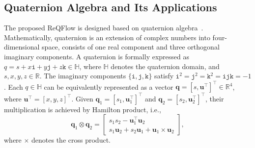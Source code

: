 \subsection{Quaternion Algebra and Its Applications}
The proposed ReQFlow is designed based on quaternion algebra~\cite{dam1998quaternions,zhu2018quaternion}.
Mathematically, quaternion is an extension of complex numbers into four-dimensional space, consists of one real component and three orthogonal imaginary components. 
A quaternion is formally expressed as $q = s + x\texttt{i} + y\texttt{j} + z\texttt{k} \in \mathbb{H}$, where $\mathbb{H}$ denotes the quaternion domain, and $s, x, y, z \in \mathbb{R}$. 
The imaginary components $\{\texttt{i}, \texttt{j}, \texttt{k}\}$ satisfy $\texttt{i}^2 = \texttt{j}^2 = \texttt{k}^2 = \texttt{ijk} = -1$. 
Each $q\in\mathbb{H}$ can be equivalently represented as a vector $\bm{q} = [s, \bm{u}^\top]^\top\in\mathbb{R}^4$, where $\bm{u}^\top = [x, y, z]^\top$. 
Given $\bm{q}_1 = [s_1, \bm{u}_1^\top]^\top$ and $\bm{q}_2 = [s_2, \bm{u}_2^\top]^\top$, their multiplication is achieved by Hamilton product, i.e., 
\begin{equation}\label{eq:hamilton}
\bm{q}_1 \otimes \bm{q}_2 = 
\begin{bmatrix} 
s_1s_2 - \bm{u}_1^{\top}\bm{u}_2 \\ 
s_1\bm{u}_2 + s_2\bm{u}_1 + \bm{u}_1 \times \bm{u}_2 
\end{bmatrix},
\end{equation}
where $\times$ denotes the cross product. 


